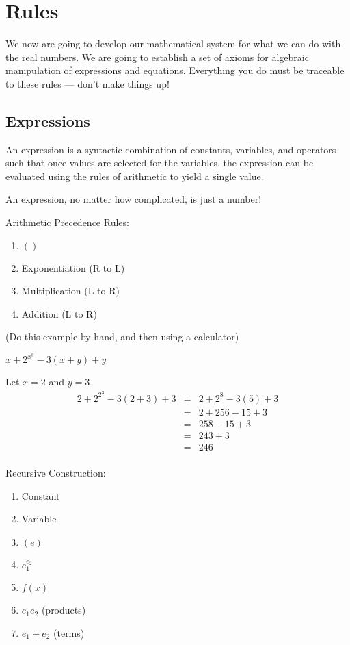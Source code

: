 \documentclass[letterpaper,12pt,fleqn]{article}
\begin{document}
\section*{Rules}

We now are going to develop our mathematical system for what we can do with the
real numbers. We are going to establish a set of axioms for algebraic
manipulation of expressions and equations. Everything you do must be traceable
to these rules --- don't make things up!

\subsection*{Expressions}

\begin{definition}[Expression]
  An expression is a syntactic combination of constants, variables, and
  operators such that once values are selected for the variables, the
  expression can be evaluated using the rules of arithmetic to yield a single
  value.
\end{definition}

An expression, no matter how complicated, is just a number!

Arithmetic Precedence Rules:
\begin{enumerate}
\item $()$
\item Exponentiation (R to L)
\item Multiplication (L to R)
\item Addition (L to R)
\end{enumerate}

\begin{example}

  (Do this example by hand, and then using a calculator)
  
  $x+2^{x^y}-3(x+y)+y$

  Let $x=2$ and $y=3$
  \begin{eqnarray*}
    2+2^{2^3}-3(2+3)+3 &=& 2+2^8-3(5)+3 \\
    &=& 2+256-15+3 \\
    &=& 258-15+3 \\
    &=& 243+3 \\
    &=& 246 \\
  \end{eqnarray*}
\end{example}

Recursive Construction:
\begin{enumerate}
\item Constant
\item Variable
\item $(e)$
\item $e_1^{e_2}$
\item $f(x)$
\item $e_1e_2$ (products)
\item $e_1+e_2$ (terms)
\end{enumerate}
\end{document}
